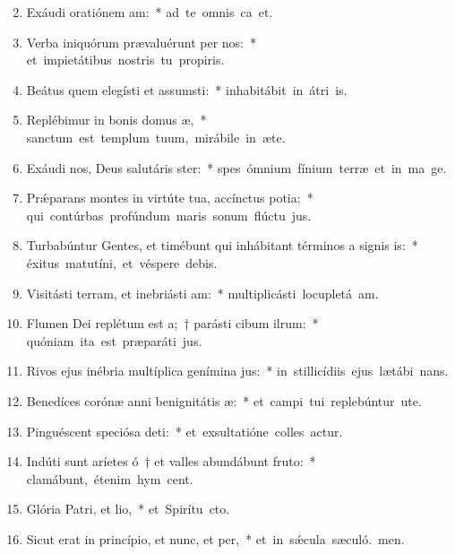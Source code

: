 \begin{flushleft}
\begin{enumerate}[leftmargin=*]
\setcounter{enumi}{1}

\item Exáudi oratiónem am:~* \mbox{ad te omnis ca et.}
\item Verba iniquórum prævaluérunt per nos:~* \mbox{et impietátibus nostris tu propiris.}
\item Beátus quem elegísti et assumsti:~* \mbox{inhabitábit in átri is.}
\item Replébimur in bonis domus æ,~* \mbox{sanctum est templum tuum, mirábile in æte.}
\item Exáudi nos, Deus salutáris ster:~* \mbox{spes ómnium fínium terræ et in ma ge.}
\item Pr\'{\ae}parans montes in virtúte tua, accínctus potia:~* \mbox{qui contúrbas profúndum maris sonum flúctu jus.}
\item Turbabúntur Gentes, et timébunt qui inhábitant términos a signis is:~* \mbox{éxitus matutíni, et véspere debis.}
\item Visitásti terram, et inebriásti am:~* \mbox{multiplicásti locupletá am.}
\item Flumen Dei replétum est a;~† parásti cibum ilrum:~* \mbox{quóniam ita est præparáti jus.}
\item Rivos ejus inébria multíplica genímina jus:~* \mbox{in stillicídiis ejus lætábi nans.}
\item Benedíces corónæ anni benignitátis æ:~* \mbox{et campi tui replebúntur ute.}
\item Pinguéscent speciósa deti:~* \mbox{et exsultatióne colles actur.}
\item Indúti sunt aríetes ó~† et valles abundábunt fruto:~* \mbox{clamábunt, étenim hym cent.}
\item Glória Patri, et lio,~* \mbox{et Spirítu cto.}
\item Sicut erat in princípio, et nunc, et per,~* \mbox{et in s\'{\ae}cula sæculó. men.}

\end{enumerate}
\end{flushleft}

